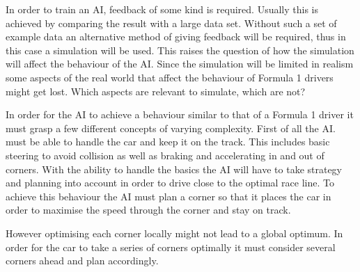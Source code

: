 In order to train an AI, feedback of some kind is required. Usually this is achieved by comparing the result with a large data set. Without such a set of example data an alternative method of giving feedback will be required, thus in this case a simulation will be used. This raises the question of how the simulation will affect the behaviour of the AI. Since the simulation will be limited in realism some aspects of the real world that affect the behaviour of Formula 1 drivers might get lost. Which aspects are relevant to simulate, which are not?

In order for the AI to achieve a behaviour similar to that of a Formula 1 driver it must grasp a few different concepts of varying complexity. First of all the AI. must be able to handle the car and keep it on the track. This includes basic steering to avoid collision as well as braking and accelerating in and out of corners. With the ability to handle the basics the AI will have to take strategy and planning into account in order to drive close to the optimal race line. To achieve this behaviour the AI must plan a corner so that it places the car in order to maximise the speed through the corner and stay on track.

However optimising each corner locally might not lead to a global optimum. In order for the car to take a series of corners optimally it must consider several corners ahead and plan accordingly. 